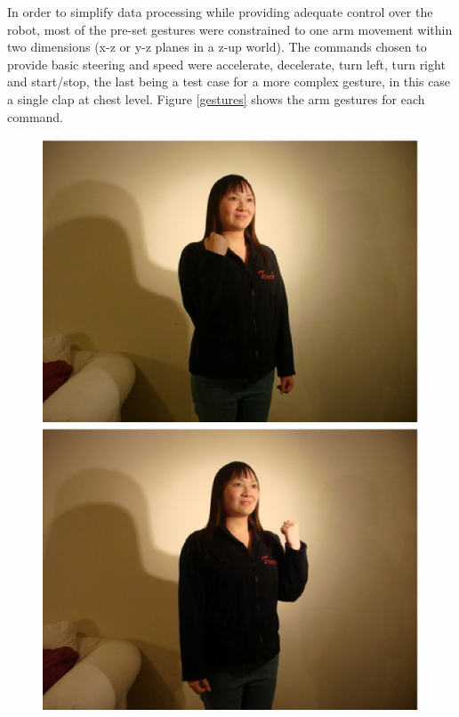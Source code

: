 \documentclass[12pt,a4,notitlepage]{report}
\renewcommand{\_}{\texttt{\symbol{95}}}
\newcommand{\<}{\texttt{\symbol{60}}}
\renewcommand{\>}{\texttt{\symbol{62}}}
\begin{document}
In order to simplify data processing while providing adequate control over the robot, most of the pre-set gestures were constrained to one arm movement within two dimensions (x-z or y-z planes in a z-up world). The commands chosen to provide basic steering and speed were accelerate, decelerate, turn left, turn right and start/stop, the last being a test case for a more complex gesture, in this case a single clap at chest level. Figure \ref{gestures} shows the arm gestures for each command.

\begin{figure}
\centering
\includegraphics[scale=0.3,angle=0]{images/accel.ps}
\includegraphics[scale=0.3,angle=0]{images/decel.ps}

\end{figure}
\end{document}
